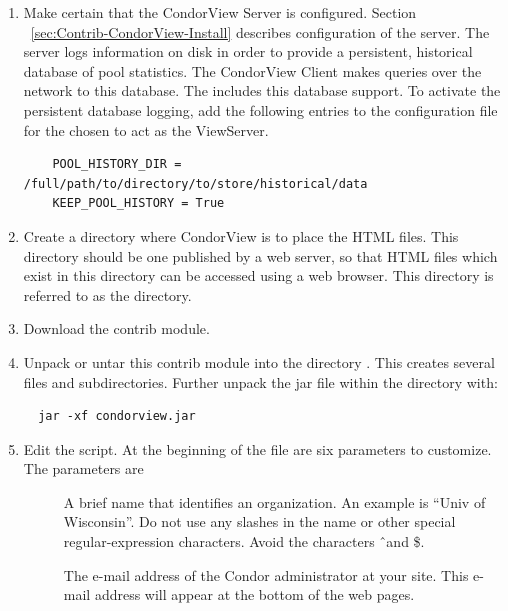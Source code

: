 \begin{enumerate}

\item Make certain that the CondorView Server is configured.
Section ~\ref{sec:Contrib-CondorView-Install}
describes configuration of the server.
The server logs information on disk in order to provide a persistent,
historical database of pool statistics.
The CondorView Client makes queries over the network to this
database.
The  includes this database support.
To activate the persistent database logging, add the following entries to
the configuration file for the  chosen to act as the ViewServer.
\begin{verbatim}
    POOL_HISTORY_DIR = /full/path/to/directory/to/store/historical/data 
    KEEP_POOL_HISTORY = True 
\end{verbatim}

\item Create a directory where CondorView is to place the HTML files.  
This directory should be one published by a web server, so that HTML
files which exist in this directory can be accessed using a web browser.  
This directory is referred to as the  directory.

\item Download the  contrib module.

\item Unpack or untar this contrib module into the
directory .
This creates several files and subdirectories.
Further unpack the jar file within the  directory with:
\begin{verbatim} 
  jar -xf condorview.jar
\end{verbatim}

\item Edit the  script.  At the beginning of the file
are six parameters to customize.
The parameters are

        \begin{description}

	\item[] A brief name that identifies an
	organization. An example is ``Univ of Wisconsin''.  Do not
	use any slashes in the name or other special regular-expression
	characters. Avoid the characters \Bs \^\  and \$.

	\item[] The e-mail
	address of the Condor administrator at your site.  
	This e-mail address will appear at the bottom of the web pages.


\end{description}
\end{enumerate}
